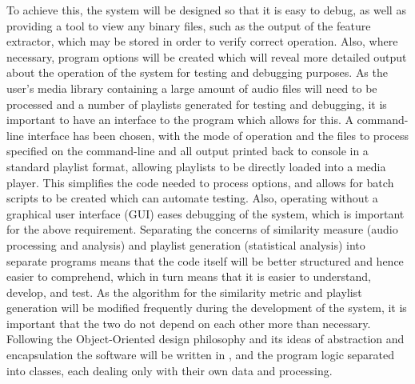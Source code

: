 To achieve this, the system will be designed so that it is easy to debug, as well as providing a tool to view any binary files, such as the output of the feature extractor, which may be stored in order to verify correct operation. Also, where necessary, program options will be created which will reveal more detailed output about the operation of the system for testing and debugging purposes.
\label{text:spec:objective:cli}
As the user's media library containing a large amount of audio files will need to be processed and a number of playlists generated for testing and debugging, it is important to have an interface to the program which allows for this. A command-line interface has been chosen, with the mode of operation and the files to process specified on the command-line and all output printed back to console in a standard playlist format, allowing playlists to be directly loaded into a media player. This simplifies the code needed to process options, and allows for batch scripts to be created which can automate testing. Also, operating without a graphical user interface (GUI) eases debugging of the system, which is important for the above requirement.
Separating the concerns of similarity measure (audio processing and analysis) and playlist generation (statistical analysis) into separate programs means that the code itself will be better structured and hence easier to comprehend, which in turn means that it is easier to understand, develop, and test. As the algorithm for the similarity metric and playlist generation will be modified frequently during the development of the system, it is important that the two do not depend on each other more than necessary. Following the Object-Oriented design philosophy and its ideas of abstraction and encapsulation the software will be written in , and the program logic separated into classes, each dealing only with their own data and processing.
